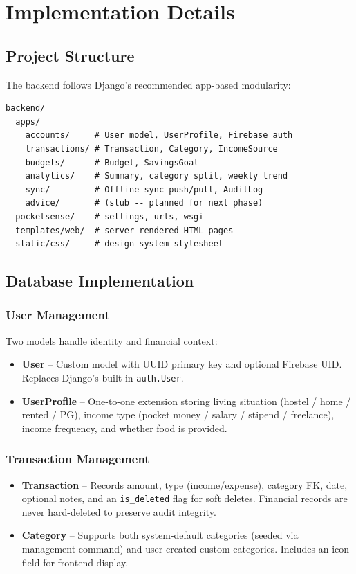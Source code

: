 \documentclass[12pt,a4paper]{article}
\begin{document}
\section{Implementation Details}

\subsection{Project Structure}
The backend follows Django's recommended app-based modularity:

\begin{lstlisting}
backend/
  apps/
    accounts/     # User model, UserProfile, Firebase auth
    transactions/ # Transaction, Category, IncomeSource
    budgets/      # Budget, SavingsGoal
    analytics/    # Summary, category split, weekly trend
    sync/         # Offline sync push/pull, AuditLog
    advice/       # (stub -- planned for next phase)
  pocketsense/    # settings, urls, wsgi
  templates/web/  # server-rendered HTML pages
  static/css/     # design-system stylesheet
\end{lstlisting}

\subsection{Database Implementation}

\subsubsection{User Management}
Two models handle identity and financial context:
\begin{itemize}[leftmargin=2em]
  \item \textbf{User} -- Custom model with UUID primary key and optional Firebase UID. Replaces Django's built-in \texttt{auth.User}.
  \item \textbf{UserProfile} -- One-to-one extension storing living situation (hostel / home / rented / PG), income type (pocket money / salary / stipend / freelance), income frequency, and whether food is provided.
\end{itemize}

\subsubsection{Transaction Management}
\begin{itemize}[leftmargin=2em]
  \item \textbf{Transaction} -- Records amount, type (income/expense), category FK, date, optional notes, and an \texttt{is\_deleted} flag for soft deletes. Financial records are never hard-deleted to preserve audit integrity.
  \item \textbf{Category} -- Supports both system-default categories (seeded via management command) and user-created custom categories. Includes an icon field for frontend display.
\end{itemize}
\end{document}
